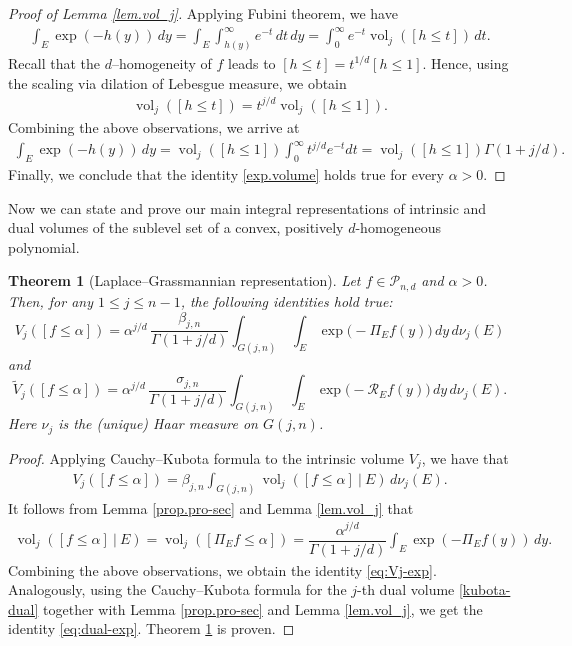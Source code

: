 \documentclass[11pt]{article}
\newtheorem{theorem}{Theorem}[section]
\theoremstyle{definition}
\numberwithin{equation}{section}
\newcommand{\cP}{\mathcal{P}}        %
\DeclareMathOperator{\vol}{vol}
\begin{document}
\begin{proof}[Proof of Lemma \ref{lem.vol_j}]
Applying Fubini theorem, we have 
\begin{align*}
    \int_E \exp(- h(y)) \, dy = \int_E \int_{h(y)}^\infty e^{-t} \, dt \, dy = \int_0^\infty e^{- t } \vol_j([h \leq t]) \, dt.
\end{align*}
Recall that the $d$--homogeneity of $f$ leads to $[h \leq t] = t^{1/d} [h \leq 1]$.
Hence, using the scaling via dilation of Lebesgue measure, we obtain
    \begin{align*}
        \vol_j([h \leq t]) = t^{j/d}\vol_j([h \leq 1]).
    \end{align*}
Combining the above observations, we arrive at
\begin{align*}
    \int_E \exp(-h(y)) \, dy = \vol_j([h \leq 1]) \int_0^\infty t^{j/d}e^{-t} dt =  \vol_j([h \leq 1]) \Gamma(1 + j/d).
\end{align*}
Finally, we conclude that the identity \eqref{exp.volume} holds true for every $\alpha > 0$.
\end{proof}

Now we can state and prove our main integral representations of intrinsic and dual volumes of the sublevel set of a convex, positively $d$-homogeneous polynomial.
\begin{theorem}[Laplace--Grassmannian representation]\label{thm.representation}
    Let $f \in \cP_{n, d}$ and $\alpha > 0$.
    Then, for any $1 \leq j \leq n - 1$, the following identities hold true:
    \begin{equation}\label{eq:Vj-exp}
        V_j([f\le \alpha]) = \alpha^{j/d}  \,\frac{\beta_{j,n} }{\Gamma(1+j/d)}
\int_{G(j,n)} \ \int_{E} \exp\big(-\Pi_E f(y)\big)\,dy \, d\nu_j(E)
    \end{equation}
    and 
    \begin{equation}\label{eq:dual-exp}
        \widetilde V_j([f\le \alpha])  = \alpha^{j/d} \,\frac{\sigma_{j,n}}{\Gamma(1+j/d)}
        \int_{G(j,n)} \ \int_{E} \exp\big(-\mathscr R_E f(y)\big)\,dy\, d\nu_j(E).
    \end{equation}
    Here $\nu_j$ is the (unique) Haar measure on $G(j, n)$.
\end{theorem}

\begin{proof}
Applying Cauchy--Kubota formula to the intrinsic volume $V_j$, we have that
\begin{align*}
    V_j([f \leq \alpha]) = \beta_{j, n} \int_{G(j, n)} \vol_j([f\le \alpha]\ \big|\ E) \, d\nu_j(E).
\end{align*}
It follows from Lemma \ref{prop.pro-sec} and Lemma \ref{lem.vol_j} that
\begin{align*}
    \vol_j([f\le \alpha]\ \big|\ E) = \vol_j([\Pi_E f \leq \alpha]) =  \dfrac{\alpha^{j/d}}{\Gamma(1 + j/d)} \int_E \exp(- \Pi_E f(y)) \, dy.
\end{align*}
Combining the above observations, we obtain the identity \eqref{eq:Vj-exp}.
Analogously, using the Cauchy--Kubota formula for the $j$-th dual volume \eqref{kubota-dual} together with Lemma \ref{prop.pro-sec} and Lemma \ref{lem.vol_j}, we get the identity \eqref{eq:dual-exp}.
Theorem \ref{thm.representation} is proven.    
\end{proof}
\end{document}
